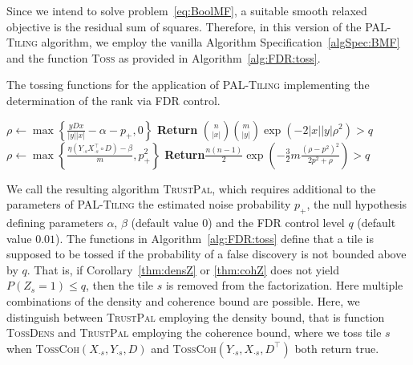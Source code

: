 Since we intend to solve problem~\eqref{eq:BoolMF}, a suitable smooth relaxed objective is the residual sum of squares. Therefore, in this version of the \textsc{PAL-Tiling} algorithm, we employ the vanilla Algorithm Specification~\ref{algSpec:BMF} and the function \textsc{Toss} as provided in Algorithm~\ref{alg:FDR:toss}.
\begin{algorithm}[t]
\caption{The tossing functions for the application of \textsc{PAL-Tiling} implementing the determination of the rank via FDR control.}
\begin{algorithmic}[1]
{}
    \State $\rho\gets\max\left\{\frac{yDx}{|y||x|} -\alpha -p_+,0\right\}$
    \State \textbf{Return} $\displaystyle\binom{n}{|x|}\binom{m}{|y|}\exp(-2|x||y|\rho^2)>q$
\EndFunction
\State
{}
    \State $\displaystyle\rho\gets\max\left\{\frac{\eta(Y_{\cdot s}X_{\cdot s}^\top\circ D)-\beta}{m}, p_+^2\right\}$
    \State \textbf{Return}$\displaystyle\frac{n(n-1)}{2}\exp\left(-\frac{3}{2}m\frac{(\rho-p^2)^2}{2p^2+\rho}\right)>q$ 
\EndFunction
\end{algorithmic}
\label{alg:FDR:toss}
\end{algorithm}
We call the resulting algorithm \textsc{TrustPal}, which requires additional to the parameters of \textsc{PAL-Tiling} the estimated noise probability $p_+$, the null hypothesis defining parameters $\alpha$, $\beta$ (default value $0$) and the FDR control level $q$ (default value $0.01$). 
The functions in Algorithm~\ref{alg:FDR:toss} define that a tile is supposed to be tossed if the probability of a false discovery is not bounded above by $q$. That is, if Corollary~\ref{thm:densZ} or \ref{thm:cohZ} does not yield $P(Z_s=1)\leq q$, then the tile $s$ is removed from the factorization. Here multiple combinations of the density and coherence bound are possible. Here, we distinguish between \textsc{TrustPal} employing the density bound, that is function \textsc{TossDens} and \textsc{TrustPal} employing the coherence bound, where we toss tile $s$ when \textsc{TossCoh}$(X_{\cdot s},Y_{\cdot s},D)$ and \textsc{TossCoh}$(Y_{\cdot s},X_{\cdot s},D^\top)$ both return true.
